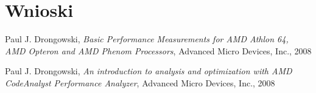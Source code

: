 \documentclass{scrartcl}
\begin{document}
\section{Wnioski}

\begin{thebibliography}{9}

 Paul J. Drongowski,
  \emph{Basic Performance Measurements for AMD Athlon 64, 
AMD Opteron and AMD Phenom Processors}, Advanced Micro Devices, Inc.,
  2008

 Paul J. Drongowski,
  \emph{An introduction to analysis and optimization 
with AMD CodeAnalyst Performance Analyzer}, Advanced Micro Devices, Inc.,
  2008

\end{thebibliography}
\end{document}
